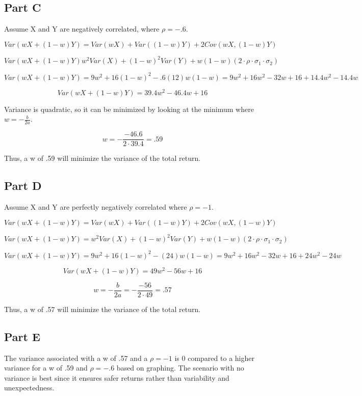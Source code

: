 \documentclass[letterpaper]{article}
\begin{document}
\subsection*{Part C}

Assume X and Y are negatively correlated, where $\rho = -.6$.

$$Var(wX + (1-w)Y) = Var(wX) + Var((1-w)Y) + 2 Cov(wX, (1-w)Y)$$

$$Var(wX + (1-w)Y)w^2 Var(X) + (1-w)^2 Var(Y) + w(1-w)(2 \cdot \rho \cdot \sigma_1 \cdot \sigma_2)$$

$$Var(wX + (1-w)Y) = 9w^2 + 16(1-w)^2 -.6(12)w(1-w) = 9w^2 + 16w^2 - 32w + 16 + 14.4w^2 -14.4w$$

$$Var(wX + (1-w)Y) = 39.4w^2 -46.4w + 16$$

\noindent Variance is quadratic, so it can be minimized by looking at the minimum where $w = -\frac{b}{2a}$.

$$w = -\frac{-46.6}{2 \cdot 39.4} = .59$$

\noindent Thus, a w of .59 will minimize the variance of the total return.

\subsection*{Part D}

Assume X and Y are perfectly negatively correlated where $\rho = -1$.

$$Var(wX + (1-w)Y) = Var(wX) + Var((1-w)Y) + 2 Cov(wX, (1-w)Y)$$

$$Var(wX + (1-w)Y) = w^2 Var(X) + (1-w)^2 Var(Y) + w(1-w)(2 \cdot \rho \cdot \sigma_1 \cdot \sigma_2)$$

$$Var(wX + (1-w)Y) = 9w^2 + 16(1-w)^2 -(24)w(1-w) = 9w^2 + 16w^2 - 32w + 16 + 24w^2 - 24w$$

$$Var(wX + (1-w)Y) = 49w^2 - 56w + 16$$

$$w = - \frac{b}{2a} = - \frac{-56}{2 \cdot 49} = .57$$

\noindent Thus, a w of .57 will minimize the variance of the total return.

\subsection*{Part E}

The variance associated with a w of .57 and a $\rho = -1$ is 0 compared to a higher variance for a w of .59 and $\rho = -.6$ based on graphing. The scenario with no variance is best since it ensures safer returns rather than variability and unexpectedness.
\end{document}
